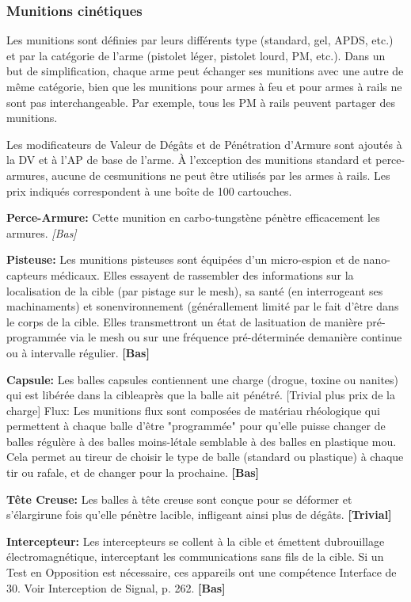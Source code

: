 \subsubsection{Munitions cinétiques} 

Les munitions sont définies par leurs différents type (standard, gel, APDS, etc.) et par la catégorie de l'arme (pistolet léger, pistolet lourd, PM, etc.). Dans un but de simplification, chaque arme peut échanger ses munitions avec une autre de même catégorie, bien que les munitions pour armes à feu et pour armes à rails ne sont pas interchangeable. Par exemple, tous les PM à rails peuvent partager des munitions. 

Les modificateurs de Valeur de Dégâts et de Pénétration d'Armure sont ajoutés à la DV et à l'AP de base de l'arme. À l'exception des munitions standard et perce-armures, aucune de cesmunitions ne peut être utilisés par les armes à rails. Les prix indiqués correspondent à une boîte de 100 cartouches. 

\textbf{Perce-Armure:} Cette munition en carbo-tungstène pénètre efficacement les armures. \textit{[Bas]} 

\textbf{Pisteuse:} Les munitions pisteuses sont équipées d'un micro-espion et de nano-capteurs médicaux. Elles essayent de rassembler des informations sur la localisation de la cible (par pistage sur le mesh), sa santé (en interrogeant ses machinaments) et sonenvironnement (générallement limité par le fait d'être dans le corps de la cible. Elles transmettront un état de lasituation de manière pré-programmée via le mesh ou sur une fréquence pré-déterminée demanière continue ou à intervalle régulier. \textbf{[Bas]} 

\textbf{Capsule:} Les balles capsules contiennent une charge (drogue, toxine ou nanites) qui est libérée dans la cibleaprès que la balle ait pénétré. [Trivial plus prix de la charge] Flux: Les munitions flux sont composées de matériau rhéologique qui permettent à chaque balle d'être "programmée" pour qu'elle puisse changer de balles régulère à des balles moins-létale semblable à des balles en plastique mou. Cela permet au tireur de choisir le type de balle (standard ou plastique) à chaque tir ou rafale, et de changer pour la prochaine. \textbf{[Bas]} 

\textbf{Tête Creuse:} Les balles à tête creuse sont conçue pour se déformer et s'élargirune fois qu'elle pénètre lacible, infligeant ainsi plus de dégâts. \textbf{[Trivial]} 

\textbf{Intercepteur:} Les intercepteurs se collent à la cible et émettent dubrouillage électromagnétique, interceptant les communications sans fils de la cible. Si un Test en Opposition est nécessaire, ces appareils ont une compétence Interface de 30. Voir Interception de Signal, p. 262. \textbf{[Bas]} 


